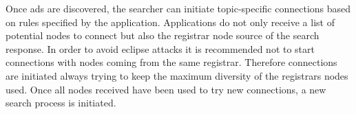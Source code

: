 Once ads are discovered,  the searcher can initiate topic-specific connections based on rules specified by the application. 
Applications do not only receive a list of potential nodes to connect but also the registrar node source of the search response.
In order to avoid eclipse attacks it is recommended not to start connections with nodes coming from the same registrar. 
Therefore connections are initiated always trying to keep the maximum diversity of the  registrars nodes used.
Once all nodes received have been used to try new connections,  a new search process is initiated. 




